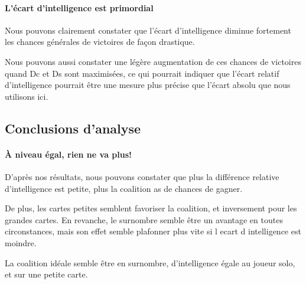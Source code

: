 \paragraph{L'écart d'intelligence est primordial}
Nous pouvons clairement constater que l'écart d'intelligence diminue fortement les chances générales de victoires de façon drastique.

Nous pouvons aussi constater une légère augmentation de ces chances de victoires quand Dc et Ds sont maximisées, ce qui pourrait indiquer que l'écart relatif d'intelligence pourrait être une mesure plus précise que l'écart absolu que nous utilisons ici.

\subsection{Conclusions d'analyse}

\paragraph{À niveau égal, rien ne va plus!}
D'après nos résultats, nous pouvons constater que plus la différence relative d'intelligence est petite, plus la coalition as de chances de gagner.

De plus, les cartes petites semblent favoriser la coalition, et inversement pour les grandes cartes. 
En revanche, le surnombre semble être un avantage en toutes circonstances, mais son effet semble plafonner plus vite si l ecart d intelligence est moindre.


\begin{result}
	La coalition idéale semble être en surnombre, d'intelligence égale au joueur solo, et sur une petite carte. 
\end{result}

